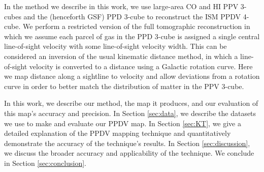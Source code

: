 In the method we describe in this work, we use large-area CO and HI PPV 3-cubes and the \citet{Green_2015} (henceforth GSF) PPD 3-cube to reconstruct the ISM PPDV 4-cube. We perform a restricted version of the full tomographic reconstruction in which we assume each parcel of gas in the PPD 3-cube is assigned a single central line-of-sight velocity with some line-of-sight velocity width. This can be considered an inversion of the usual kinematic distance method, in which a line-of-sight velocity is converted to a distance using a Galactic rotation curve. Here we map distance along a sightline to velocity and allow deviations from a rotation curve in order to better match the distribution of matter in the PPV 3-cube.

In this work, we describe our method, the map it produces, and our evaluation of this map's accuracy and precision.
In Section \ref{sec:data}, we describe the datasets we use to make and evaluate our PPDV map.
In Section \ref{sec:KT}, we give a detailed explanation of the PPDV mapping technique and quantitatively demonstrate the accuracy of the technique's results.
In Section \ref{sec:discussion}, we discuss the broader accuracy and applicability of the technique.
We conclude in Section \ref{sec:conclusion}.
